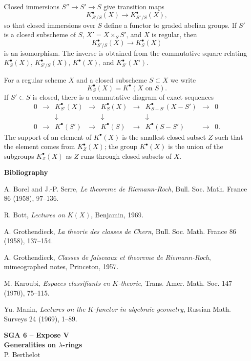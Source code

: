 \documentclass[13pt]{extarticle}
\begin{document}
Closed immersions $S''\to S'\to S$ give transition maps
\[
K^{\bullet}_{S'/S}(X)\to K^{\bullet}_{S''/S}(X),
\]
so that closed immersions over $S$ define a functor to graded abelian groups. If $S'$ is a closed subscheme of $S$, $X'=X\times_SS'$, and $X$ is regular, then
\[
K^{\bullet}_{S'/S}(X)\longrightarrow K^{\bullet}_S(X)
\]
is an isomorphism. The inverse is obtained from the commutative square relating $K^{\bullet}_S(X)$, $K^{\bullet}_{S'/S}(X)$, $K^{\bullet}(X)$, and $K^{\bullet}_{S'}(X')$.

For a regular scheme $X$ and a closed subscheme $S\subset X$ we write
\[
K^{\bullet}_S(X)=K^{\bullet}(X\text{ on }S).
\]
If $S'\subset S$ is closed, there is a commutative diagram of exact sequences
\[
\begin{array}{ccccccccc}
0&\to&K^{\bullet}_{S'}(X)&\to&K^{\bullet}_S(X)&\to&K^{\bullet}_{S-S'}(X-S')&\to&0\\
&&\downarrow&&\downarrow&&\downarrow&&\\
0&\to&K^{\bullet}(S')&\to&K^{\bullet}(S)&\to&K^{\bullet}(S-S')&\to&0.
\end{array}
\]
The support of an element of $K^{\bullet}(X)$ is the smallest closed subset $Z$ such that the element comes from $K^{\bullet}_Z(X)$; the group $K^{\bullet}(X)$ is the union of the subgroups $K^{\bullet}_Z(X)$ as $Z$ runs through closed subsets of $X$.

\begin{center}\textbf{Bibliography}\end{center}
A. Borel and J.-P. Serre, \emph{Le theoreme de Riemann-Roch}, Bull. Soc. Math. France 86 (1958), 97--136.\par
R. Bott, \emph{Lectures on $K(X)$}, Benjamin, 1969.\par
A. Grothendieck, \emph{La theorie des classes de Chern}, Bull. Soc. Math. France 86 (1958), 137--154.\par
A. Grothendieck, \emph{Classes de faisceaux et theoreme de Riemann-Roch}, mimeographed notes, Princeton, 1957.\par
M. Karoubi, \emph{Espaces classifiants en $K$-theorie}, Trans. Amer. Math. Soc. 147 (1970), 75--115.\par
Yu. Manin, \emph{Lectures on the $K$-functor in algebraic geometry}, Russian Math. Surveys 24 (1969), 1--89.

\newpage
\begin{center}
{\Large\textbf{SGA 6 -- Expose V}}\\[0.35em]
{\large\textbf{Generalities on $\lambda$-rings}}\\[0.25em]
{\large P. Berthelot}
\end{center}
\end{document}
